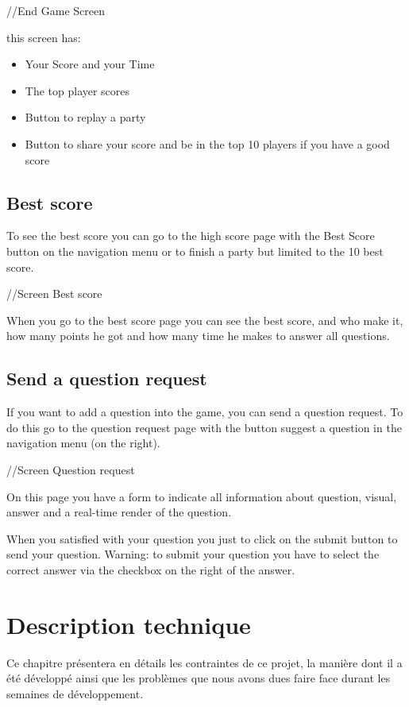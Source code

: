\documentclass[a4paper,11pt, oneside]{book}
\begin{document}
//End Game Screen

this screen has:
\begin{itemize}
\item Your Score and your Time
\item The top player scores
\item Button to replay a party
\item Button to share your score and be in the top 10 players if you have a good score
\end{itemize}

\section{Best score}
To see the best score you can go to the high score page with the Best Score button on the navigation menu or to finish a party but limited to the 10 best score.

//Screen Best score

When you go to the best score page you can see the best score, and who make it, how many points he got and how many time he makes to answer all questions.

\section{Send a question request}
If you want to add a question into the game, you can send a question request.
To do this go to the question request page with the button suggest a question in the navigation menu (on the right).

//Screen Question request

On this page you have a form to indicate all information about question, visual, answer and a real-time render of the question.

When you satisfied with your question you just to click on the submit button to send your question.
Warning: to submit your question you have to select the correct answer via the checkbox on the right of the answer.

\newpage
\chapter{Description technique}

	Ce chapitre présentera en détails les contraintes de ce projet, la manière dont il a été développé ainsi que les problèmes que nous avons dues faire face
	durant les semaines de développement.
\end{document}
